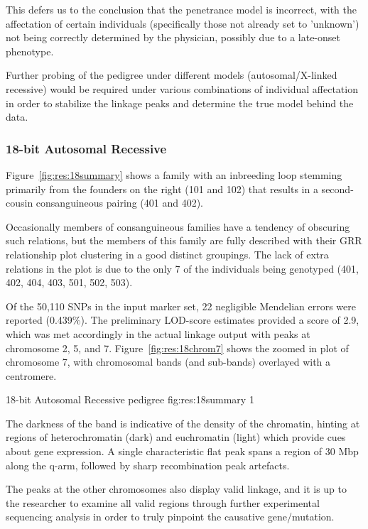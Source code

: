 This defers us to the conclusion that the penetrance model is incorrect, with the affectation of certain individuals (specifically those not already set to 'unknown') not being correctly determined by the physician, possibly due to a late-onset phenotype.

Further probing of the pedigree under different models (autosomal/X-linked recessive)  would be required under various combinations of individual affectation in order to stabilize the linkage peaks and determine the true model behind the data.

\subsubsection*{18-bit Autosomal Recessive}

Figure~\ref{fig:res:18summary} shows a family with an inbreeding loop stemming primarily from the founders on the right (101 and 102) that results in a second-cousin consanguineous pairing (401 and 402).

Occasionally members of consanguineous families have a tendency of obscuring such relations, but the members of this family are fully described with their GRR relationship plot clustering in a good distinct groupings. The lack of extra relations in the plot is due to the only 7 of the individuals being genotyped (401, 402, 404, 403, 501, 502, 503).

Of the 50,110 SNPs in the input marker set, 22 negligible Mendelian errors were reported (0.439\%). The preliminary  LOD-score estimates provided a score of 2.9, which was met accordingly in the actual linkage output with peaks at chromosome 2, 5, and 7. Figure~\ref{fig:res:18chrom7} shows the zoomed in plot of chromosome 7, with chromosomal bands (and sub-bands) overlayed with a centromere. 

	{18-bit Autosomal Recessive pedigree}
	{fig:res:18summary}
	{1}
	
The darkness of the band is indicative of the density of the chromatin, hinting at regions of heterochromatin (dark) and euchromatin (light) which provide cues about gene expression. A single characteristic flat peak spans a region of 30 Mbp along the q-arm, followed by sharp recombination peak artefacts.

The peaks at the other chromosomes also display valid linkage, and it is up to the researcher to examine all valid regions through further experimental sequencing analysis in order to truly pinpoint the causative gene/mutation.

